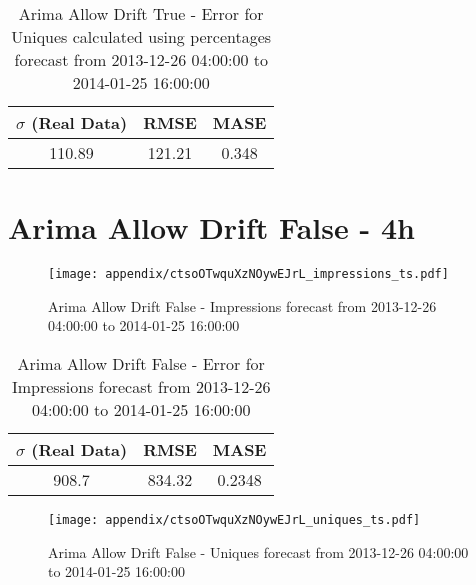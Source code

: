 \begin{table}[H]
\centering
\footnotesize
\begin{tabular}{ccc}
$\sigma$ (Real Data) & RMSE & MASE   \\ \hline
110.89 & 121.21 & 0.348 \\
\end{tabular}

\vspace{0.5cm}

\caption[]{
Arima Allow Drift True - Error for Uniques calculated using percentages forecast from 2013-12-26 04:00:00 to 2014-01-25 16:00:00}
\end{table}

\section{Arima Allow Drift False - 4h}
\begin{figure}[H] \begin{center} \leavevmode
\texttt{[image: appendix/ctsoOTwquXzNOywEJrL\_impressions\_ts.pdf]} \caption[]{
Arima Allow Drift False - Impressions forecast from 2013-12-26 04:00:00 to 2014-01-25 16:00:00} \label{fig:appendix/ctsoOTwquXzNOywEJrL_impressions_ts.pdf} \end{center}
\end{figure}

\begin{table}[H]
\centering
\footnotesize
\begin{tabular}{ccc}
$\sigma$ (Real Data) & RMSE & MASE   \\ \hline
908.7 & 834.32 & 0.2348 \\
\end{tabular}

\vspace{0.5cm}

\caption[]{
Arima Allow Drift False - Error for Impressions forecast from 2013-12-26 04:00:00 to 2014-01-25 16:00:00}
\end{table}

\begin{figure}[H] \begin{center} \leavevmode
\texttt{[image: appendix/ctsoOTwquXzNOywEJrL\_uniques\_ts.pdf]} \caption[]{
Arima Allow Drift False - Uniques forecast from 2013-12-26 04:00:00 to 2014-01-25 16:00:00} \label{fig:appendix/ctsoOTwquXzNOywEJrL_uniques_ts.pdf} \end{center}
\end{figure}

